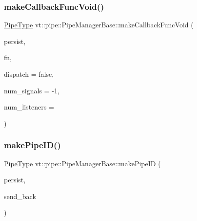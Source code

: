 \mbox{\label{structvt_1_1pipe_1_1_pipe_manager_base_a20bf85e7494b5d018ed24b052f56fc28}} 
\subsubsection{\texorpdfstring{make\+Callback\+Func\+Void()}{makeCallbackFuncVoid()}}
{\footnotesize\ttfamily \hyperlink{namespacevt_ac9852acda74d1896f48f406cd72c7bd3}{Pipe\+Type} vt\+::pipe\+::\+Pipe\+Manager\+Base\+::make\+Callback\+Func\+Void (\begin{DoxyParamCaption}\item[{bool const \&}]{persist,  }\item[{\hyperlink{structvt_1_1pipe_1_1_pipe_manager_base_a7ddc75a14fa50cd8521641ef6f9ea78d}{Func\+Type}}]{fn,  }\item[{bool const \&}]{dispatch = {\ttfamily false},  }\item[{\hyperlink{namespacevt_a9b39ce9494bb04674d0d5b895a5aa50f}{Ref\+Type}}]{num\+\_\+signals = {\ttfamily -\/1},  }\item[{\hyperlink{namespacevt_a9b39ce9494bb04674d0d5b895a5aa50f}{Ref\+Type}}]{num\+\_\+listeners = {} }\end{DoxyParamCaption})}

\mbox{\label{structvt_1_1pipe_1_1_pipe_manager_base_af1ba11407837cb69b4d205dd7ba880b0}} 
\subsubsection{\texorpdfstring{make\+Pipe\+I\+D()}{makePipeID()}}
{\footnotesize\ttfamily \hyperlink{namespacevt_ac9852acda74d1896f48f406cd72c7bd3}{Pipe\+Type} vt\+::pipe\+::\+Pipe\+Manager\+Base\+::make\+Pipe\+ID (\begin{DoxyParamCaption}\item[{bool const}]{persist,  }\item[{bool const}]{send\+\_\+back }\end{DoxyParamCaption})\hspace{0.3cm}{\ttfamily [protected]}}

